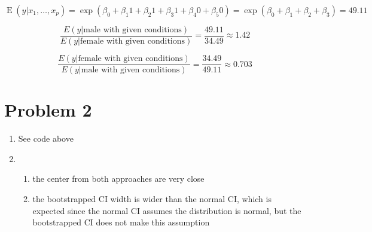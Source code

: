 \documentclass{article}
\DeclareMathOperator{\E}{E}
\begin{document}
\begin{enumerate}[label=(\alph*)]
    \[
      \E(y|x_1, \ldots, x_p) = \exp(\beta_0 + \beta_1 1 + \beta_2 1 + \beta_3 1 + \beta_4 0 + \beta_5 0) = \exp(\beta_0 + \beta_1 + \beta_2 + \beta_3) = 49.11
    \]

    \[\frac{E(y|\text{male with given conditions})}{E(y|\text{female with given conditions})} = \frac{49.11}{34.49} \approx 1.42\]

    \[\frac{E(y|\text{female with given conditions})}{E(y|\text{male with given conditions})} = \frac{34.49}{49.11} \approx 0.703\]

\end{enumerate}

\section*{Problem 2}

\begin{enumerate}[label=(\alph*)]
  \item See code above
  \item
    \begin{enumerate}[label=(\roman*)]
      \item the center from both approaches are very close
      \item the bootstrapped CI width is wider than the normal CI, which is expected since the normal CI assumes the distribution is normal, but the bootstrapped CI does not make this assumption

    \end{enumerate}
\end{enumerate}
\end{document}
